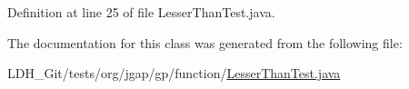 Definition at line 25 of file Lesser\-Than\-Test.\-java.



The documentation for this class was generated from the following file\-:\begin{DoxyCompactItemize}
\item 
L\-D\-H\-\_\-\-Git/tests/org/jgap/gp/function/\hyperlink{_lesser_than_test_8java}{Lesser\-Than\-Test.\-java}\end{DoxyCompactItemize}
